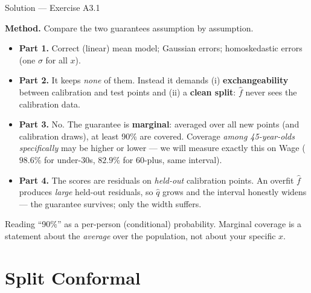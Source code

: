 \documentclass[aspectratio=169,11pt]{beamer}
\begin{document}
\begin{frame}{Solution --- Exercise A3.1}
\begin{solutionbox}
  \textbf{Method.} Compare the two guarantees assumption by assumption.
  \begin{itemize}
    \item \textbf{Part 1.} Correct (linear) mean model; Gaussian errors;
          homoskedastic errors (one $\sigma$ for all $x$).
    \item \textbf{Part 2.} It keeps \emph{none} of them. Instead it demands
          (i) \textbf{exchangeability} between calibration and test points and
          (ii) a \textbf{clean split}: $\hat f$ never sees the calibration data.
    \item \textbf{Part 3.} No. The guarantee is \textbf{marginal}: averaged over all
          new points (and calibration draws), at least 90\% are covered. Coverage
          \emph{among 45-year-olds specifically} may be higher or lower --- we will
          measure exactly this on Wage ($98.6\%$ for under-30s, $82.9\%$ for
          60-plus, same interval).
    \item \textbf{Part 4.} The scores are residuals on \emph{held-out} calibration
          points. An overfit $\hat f$ produces \emph{large} held-out residuals, so
          $\hat q$ grows and the interval honestly widens --- the guarantee survives;
          only the width suffers.
  \end{itemize}
\end{solutionbox}
\begin{mistake}
  Reading ``90\%'' as a per-person (conditional) probability. Marginal coverage is a
  statement about the \emph{average} over the population, not about your specific $x$.
\end{mistake}
\end{frame}

\section{Split Conformal}
\end{document}
